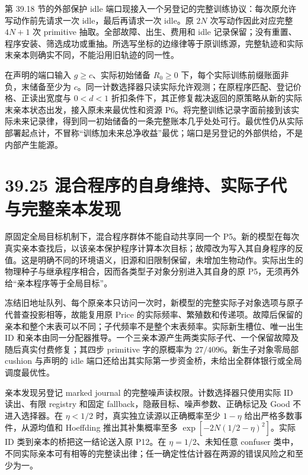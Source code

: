 \documentclass[
  11pt,
  oneside]{book}
\begin{document}
第 39.18 节的外部保护 idle 端口现接入一个另登记的完整训练协议：每次原允许写动作前先请求一次 idle，最后再请求一次 idle。原 \(2N\) 次写动作因此对应完整 \(4N+1\) 次 primitive 抽取。全部故障、出生、费用和 idle 记录保留；没有重置、程序安装、筛选成功或重抽。所选写坐标的边缘律等于原训练源，完整轨迹和实际末亲本则确实不同，不能沿用旧轨迹的同一性。

在声明的端口输入 \(g\ge c\)、实际初始储备 \(R_0\ge0\) 下，每个实际训练前缀账面非负，末储备至少为 \(c\)。同一计数选择器只读实际允许观测；在原程序匹配、登记价格、正读出宽度与 \(0<d<1\) 折扣条件下，其正修复裁决返回的原策略从新的实际末亲本状态出发，接入原未来最优性和资源 P6。将完整训练记录字面前接到该实际未来记录律，得到同一初始储备的一条完整账本几乎处处可行。最优性仍从实际部署起点计，不冒称``训练加未来总净收益''最优；端口是另登记的外部供给，不是内部产生能源。

\section{39.25 混合程序的自身维持、实际子代与完整亲本发现}\label{ux6df7ux5408ux7a0bux5e8fux7684ux81eaux8eabux7ef4ux6301ux5b9eux9645ux5b50ux4ee3ux4e0eux5b8cux6574ux4eb2ux672cux53d1ux73b0}

原固定全局目标机制下，混合程序群体不能自动共享同一个 P5。新的模型在每次真实亲本查找后，以该亲本保护程序计算本次目标；故障改为写入其自身程序的反值。这是明确不同的环境语义，旧源和旧限制保留，未增加生物动作。实际出生的物理种子与继承程序相合，因而各类型子对象分别进入其自身的原 P5，无须再外给``亲本程序等于全局目标''。

冻结旧地址队列、每个原亲本只访问一次时，新模型的完整实际子对象选项与原子代普查投影相等，故能复用原 Price 的实际频率、繁殖数和传递项。故障后保留的亲本和整个末表可以不同；子代频率不是整个末表频率。实际新生槽位、唯一出生 ID 和亲本由同一分配器推导。一个三亲本源产生两类实际子代、一个保留故障及随后真实付费修复；其四步 primitive 字的原概率为 \(27/4096\)。新生子对象零局部 cushion 与声明的 idle 端口还给出其实际第一步资金桥，未给出全群体银行或全局调度最优性。

亲本发现另登记 marked journal 的完整噪声读权限。计数选择器只使用实际 ID 读出、有限 registry 和固定 fallback，隐蔽目标、噪声参数、正确标记及 Good 不进入选择器。在 \(\eta<1/2\) 时，真实独立读源以正确概率至少 \(1-\eta\) 给出严格多数事件，从源均值和 Hoeffding 推出其补集概率至多 \(\exp[-2N(1/2-\eta)^2]\)。实际 ID 类到亲本的桥把这一结论送入原 P12。在 \(\eta=1/2\)、未知任意 confuser 类中，不同实际亲本可有相等的完整读出律；任一确定性估计器在两源的错误风险之和至少为一。
\end{document}
